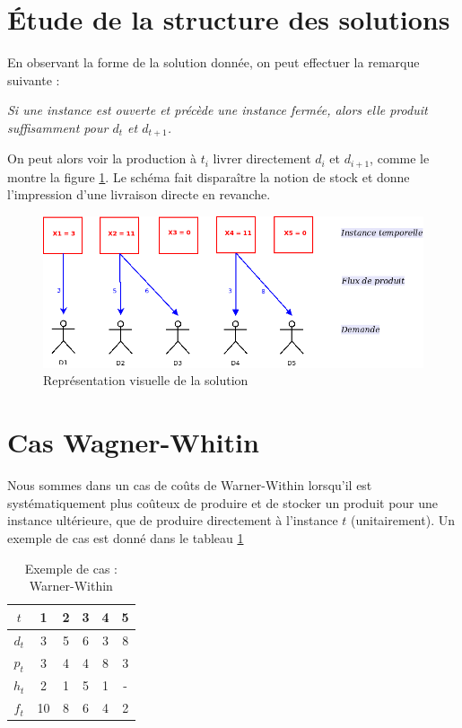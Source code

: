 \documentclass[a4paper,11pt,twoside]{report}
\begin{document}
\newpage
\section{Étude de la structure des solutions}
En observant la forme de la solution donnée, on peut effectuer la remarque suivante :



\textit{Si une instance est ouverte et précède une instance fermée, alors elle produit suffisamment pour $d_t$ et $d_{t+1}$.}




On peut alors voir la production à $t_i$ livrer directement $d_i$ et $d_{i+1}$, comme le montre la figure \ref{representation_graphique}. Le schéma fait disparaître la notion de stock et donne l'impression d'une livraison directe en revanche.


\begin{figure}[h]
 \centering
 \includegraphics[width=\textwidth]{Diagramme1.png}
 \caption{Représentation visuelle de la solution}
 \label{representation_graphique}
\end{figure}
\section{Cas Wagner-Whitin}
Nous sommes dans un cas de coûts de Warner-Within lorsqu'il est systématiquement plus coûteux de produire et de stocker un produit pour une instance ultérieure, que de produire directement à l'instance $t$ (unitairement).
Un exemple de cas est donné dans le tableau \ref{warner1}
\begin{table}[h]
  \centering
 \begin{tabular}{|c|ccccc|}
\hline
$t$&1&2&3&4&5\\\hline\hline
$d_t$&3&5&6&3&8\\
$p_t$&3&4&4&8&3\\
$h_t$&2&1&5&1&-\\
$f_t$&10&8&6&4&2\\\hline
\end{tabular}
 \caption{Exemple de cas : Warner-Within}
 \label{warner1}
\end{table}
\end{document}
